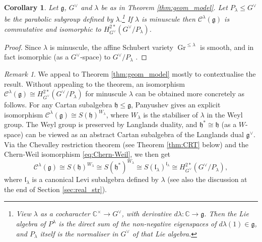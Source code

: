 \documentclass{amsart}
\newcommand{\C}{\mathbb{C}}
\newcommand{\Kir}{\mathcal{C}}
\newcommand{\g}{\mathfrak{g}}
\newcommand{\Gr}{\operatorname{Gr}}
\newcommand{\h}{\mathfrak{h}}
\newcommand{\el}{\mathfrak{l}}
\theoremstyle{definition}
\theoremstyle{plain}
\newtheorem{cor}[defn]{Corollary}
\theoremstyle{remark}
\newtheorem{rmk}[defn]{Remark}
\begin{document}
\begin{cor}
\label{cor:geom_model}
    Let $\g$, $G^\vee$ and $\lambda$ be as in Theorem \ref{thm:geom_model}. Let $P_\lambda\le G^\vee$ be the parabolic subgroup defined by $\lambda$.\footnote{View $\lambda$ as a cocharacter $\C^\times \to G^\vee$, with derivative $d\lambda\colon \C\to \g$. Then the Lie algebra of $P^\lambda$ is the direct sum of the non-negative eigenspaces of $d\lambda(1)\in \g$, and $P_\lambda$ itself is the normaliser in $G^\vee$ of that Lie algebra.}
    If $\lambda$ is minuscule then $\Kir^\lambda(\g)$ is commutative and isomorphic to $H^{2*}_{G^\vee}(G^\vee / P_\lambda)$.
\end{cor}
\begin{proof}
    Since $\lambda$ is minuscule, the affine Schubert variety $\Gr^{\le\lambda}$ is smooth, and in fact isomorphic (as a $G^\vee$-space) to $G^\vee/P_\lambda$ \cite[Lemma 2.1.13]{Zhu2016_introduction}.
\end{proof}
\begin{rmk}
\label{rmk:geom_model_explicit}
    We appeal to Theorem \ref{thm:geom_model} mostly to contextualise the result. Without appealing to the theorem, an isomorphism $\Kir^\lambda(\g)\cong H^{2*}_{G^\vee}(G^\vee / P_\lambda)$ for minuscule $\lambda$ can be obtained more concretely as follows. For any Cartan subalgebra $\h\le \g$, Panyushev \cite[Thm.\,2.6]{Panyushev2004_endoj} gives an explicit isomorphism $\Kir^\lambda(\g) \cong S(\h)^{W_\lambda}$, where $W_\lambda$ is the stabiliser of $\lambda$ in the Weyl group. The Weyl group is preserved by Langlands duality, and $\h^* \cong \h$ (as a $W$-space) can be viewed as an abstract Cartan subalgebra of the Langlands dual $\g^\vee$. Via the Chevalley restriction theorem (see Theorem \ref{thm:CRT} below) and the Chern-Weil isomorphism \eqref{eq:Chern-Weil}, we then get
    $$
        \Kir^\lambda(\g)
        \cong
        S(\h)^{W_\lambda}
        \cong
        S(\h^*)^{W_\lambda}
        \cong
        S(\el_\lambda)^{\el_\lambda}
        \cong
        H^{2*}_{G^\vee}(G^\vee/P_\lambda),
    $$
    where $\el_\lambda$ is a canonical Levi subalgebra defined by $\lambda$ (see also the discussion at the end of Section \ref{sec:real_str}).
\end{rmk}
\end{document}
